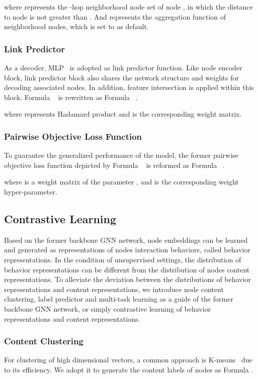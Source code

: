 \documentclass[sigconf]{acmart}
\begin{document}
\noindent where  represents the -hop neighborhood node set of node , in which the distance to node  is not greater than . And  represents the aggregation function of neighborhood nodes, which is set to  as default.

\subsubsection{Link Predictor} As a decoder, MLP~\cite{murtagh1991multilayer} is adopted as link predictor function. Like node encoder block, link predictor block also shares the network structure and weights for decoding associated nodes. In addition, feature intersection is applied within this block. Formula ~ is rewritten as Formula ~.

\noindent where  represents Hadamard product and  is the corresponding weight matrix.


\subsubsection{Pairwise Objective Loss Function } To guarantee the generalized performance of the model, the former pairwise objective loss function depicted by Formula ~ is reformed as Formula ~. 


\noindent where  is a weight matrix of the parameter , and  is the corresponding weight hyper-parameter.

\subsection{Contrastive Learning}
Based on the former backbone GNN network, node embeddings can be learned and generated as representations of nodes interaction behaviors, called behavior representations. In the condition of unsupervised settings, the distribution of behavior representations can be different from the distribution of nodes content representations. To alleviate the deviation between the distributions of behavior representations and content representations, we introduce node content clustering, label predictor and multi-task learning as a guide of the former backbone GNN network, or simply contrastive learning of behavior representations and content representations.

\subsubsection{Content Clustering}
For clustering of high dimensional vectors, a common approach is K-means~\cite{sculley2010web} due to its efficiency. We adopt it to generate the content labels of nodes as Formula .
\end{document}
